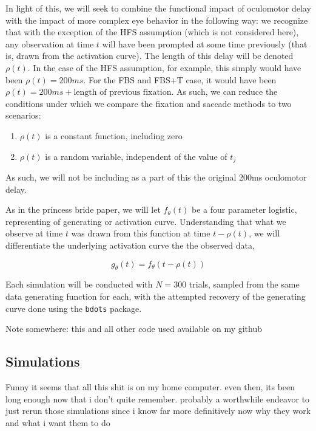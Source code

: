 \documentclass{article}
\newcommand{\xt}{\texttt}%
\begin{document}
In light of this, we will seek to combine the functional impact of oculomotor delay with the impact of more complex eye behavior in the following way: we recognize that with the exception of the HFS assumption (which is not considered here), any observation at time $t$ will have been prompted at some time previously (that is, drawn from the activation curve). The length of this delay will be denoted $\rho(t)$. In the case of the HFS assumption, for example, this simply would have been $\rho(t) = 200ms$. For the FBS and FBS+T case, it would have been $\rho(t) = 200ms + \text{length of previous fixation}$. As such, we can reduce the conditions under which we compare the fixation and saccade methods to two scenarios:

\begin{singlespace}
\begin{enumerate}
\item $\rho(t)$ is a constant function, including zero
\item $\rho(t)$ is a random variable, independent of the value of $t_j$
\end{enumerate}
\end{singlespace}

As such, we will not be including as a part of this the original 200ms oculomotor delay.

As in the princess bride paper, we will let $f_{\theta}(t)$ be a four parameter logistic, representing of generating or activation curve. Understanding that what we observe at time $t$ was drawn from this function at time $t - \rho(t)$, we will differentiate the underlying activation curve the the observed data, 

\begin{equation}
g_{\theta}(t) = f_{\theta}(t - \rho(t))
\end{equation}




Each simulation will be conducted with $N = 300$ trials, sampled from the same data generating function for each, with the attempted recovery of the generating curve done using the \xt{bdots} package. 

Note somewhere: this and all other code used available on my github

\subsection{Simulations}

Funny it seems that all this shit is on my home computer. even then, its been long enough now that i don't quite remember. probably a worthwhile endeavor to just rerun those simulations since i know far more definitively now why they work and what i want them to do
\end{document}
